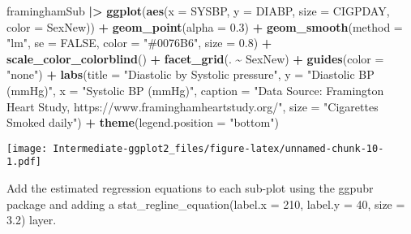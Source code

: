 \documentclass[
]{article}
\newenvironment{Shaded}{\begin{snugshade}}{\end{snugshade}}
\newcommand{\AttributeTok}[1]{\textcolor[rgb]{0.13,0.29,0.53}{#1}}
\newcommand{\ConstantTok}[1]{\textcolor[rgb]{0.56,0.35,0.01}{#1}}
\newcommand{\FloatTok}[1]{\textcolor[rgb]{0.00,0.00,0.81}{#1}}
\newcommand{\FunctionTok}[1]{\textcolor[rgb]{0.13,0.29,0.53}{\textbf{#1}}}
\newcommand{\NormalTok}[1]{#1}
\newcommand{\SpecialCharTok}[1]{\textcolor[rgb]{0.81,0.36,0.00}{\textbf{#1}}}
\newcommand{\StringTok}[1]{\textcolor[rgb]{0.31,0.60,0.02}{#1}}
\begin{document}
\begin{Shaded}
\begin{Highlighting}[]
\NormalTok{framinghamSub }\SpecialCharTok{|\textgreater{}}
  \FunctionTok{ggplot}\NormalTok{(}\FunctionTok{aes}\NormalTok{(}\AttributeTok{x =}\NormalTok{ SYSBP, }\AttributeTok{y =}\NormalTok{ DIABP,}
             \AttributeTok{size =}\NormalTok{ CIGPDAY,}
             \AttributeTok{color =}\NormalTok{ SexNew)) }\SpecialCharTok{+}
  \FunctionTok{geom\_point}\NormalTok{(}\AttributeTok{alpha =} \FloatTok{0.3}\NormalTok{) }\SpecialCharTok{+}
  \FunctionTok{geom\_smooth}\NormalTok{(}\AttributeTok{method =} \StringTok{"lm"}\NormalTok{, }\AttributeTok{se =} \ConstantTok{FALSE}\NormalTok{,}
              \AttributeTok{color =} \StringTok{"\#0076B6"}\NormalTok{, }\AttributeTok{size =} \FloatTok{0.8}\NormalTok{) }\SpecialCharTok{+}
  \FunctionTok{scale\_color\_colorblind}\NormalTok{() }\SpecialCharTok{+}
  \FunctionTok{facet\_grid}\NormalTok{(. }\SpecialCharTok{\textasciitilde{}}\NormalTok{ SexNew) }\SpecialCharTok{+}
  \FunctionTok{guides}\NormalTok{(}\AttributeTok{color =} \StringTok{"none"}\NormalTok{) }\SpecialCharTok{+}
  \FunctionTok{labs}\NormalTok{(}\AttributeTok{title =} \StringTok{"Diastolic by Systolic pressure"}\NormalTok{,}
       \AttributeTok{y =} \StringTok{"Diastolic BP (mmHg)"}\NormalTok{,}
       \AttributeTok{x =} \StringTok{"Systolic BP (mmHg)"}\NormalTok{,}
       \AttributeTok{caption =} \StringTok{"Data Source: Framington Heart Study, https://www.framinghamheartstudy.org/"}\NormalTok{,}
       \AttributeTok{size =} \StringTok{"Cigarettes Smoked daily"}\NormalTok{) }\SpecialCharTok{+}
  \FunctionTok{theme}\NormalTok{(}\AttributeTok{legend.position =} \StringTok{"bottom"}\NormalTok{)}
\end{Highlighting}
\end{Shaded}

\texttt{[image: Intermediate-ggplot2\_files/figure-latex/unnamed-chunk-10-1.pdf]}

Add the estimated regression equations to each sub-plot using the ggpubr
package and adding a stat\_regline\_equation(label.x = 210, label.y =
40, size = 3.2) layer.
\end{document}
